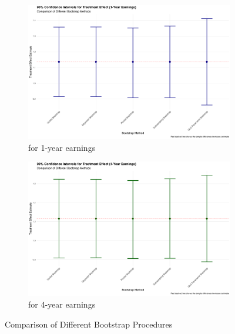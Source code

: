 \documentclass[11pt]{article}
\numberwithin{equation}{section}
\begin{document}
\begin{figure}[h]
    \centering
    \begin{subfigure}{0.48\textwidth}
    \includegraphics[width=\textwidth]{output/bootstrap_comparison_1yr.png}
    \caption{\label{fig:bootstrap_comparison_1yr}for 1-year earnings}
    \end{subfigure}
    \begin{subfigure}{0.48\textwidth}
    \includegraphics[width=\textwidth]{output/bootstrap_comparison_4yr.png}
    \caption{\label{fig:bootstrap_comparison_4yr}for 4-year earnings}
    \end{subfigure}
    \caption{\label{fig:bootstrap_comparison}Comparison of Different Bootstrap Procedures}
\end{figure}



\newpage
\end{document}
